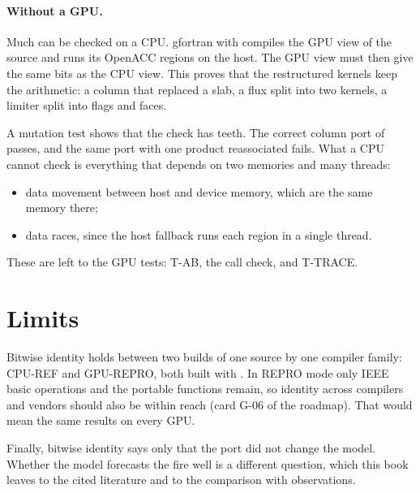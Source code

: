 \paragraph{Without a GPU.} Much can be checked on a CPU. gfortran with  compiles the GPU view of the
source and runs its OpenACC regions on the host. The GPU view must then give the same bits as the CPU view. This
proves that the restructured kernels keep the arithmetic: a column that replaced a slab, a flux split into two
kernels, a limiter split into flags and faces.

A mutation test shows that the check has teeth. The correct column port of  passes, and the same
port with one product reassociated fails. What a CPU cannot check is everything that depends on two memories and
many threads:
\begin{itemize}
  \item data movement between host and device memory, which are the same memory there;
  \item data races, since the host fallback runs each region in a single thread.
\end{itemize}
These are left to the GPU tests: T-AB, the call check, and T-TRACE.

\section{Limits}

Bitwise identity holds between two builds of one source by one compiler family: CPU-REF and GPU-REPRO, both built
with . In REPRO mode only IEEE basic operations and the portable functions remain, so identity across
compilers and vendors should also be within reach (card G-06 of the roadmap). That would mean the same results on
every GPU.

Finally, bitwise identity says only that the port did not change the model. Whether the model forecasts the fire
well is a different question, which this book leaves to the cited literature and to the comparison with
observations.

